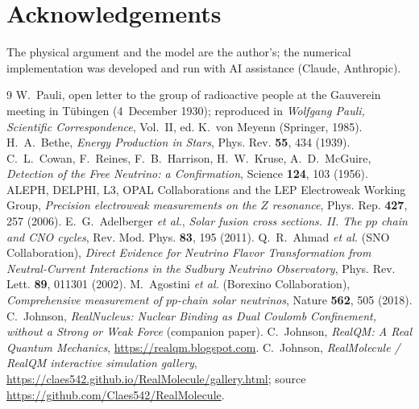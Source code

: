 \documentclass[11pt]{article}
\begin{document}
\section*{Acknowledgements}
The physical argument and the model are the author's; the numerical implementation was developed and
run with AI assistance (Claude, Anthropic).

\begin{thebibliography}{9}
 W.~Pauli, open letter to the group of radioactive people at the Gauverein meeting in
T\"ubingen (4~December 1930); reproduced in \emph{Wolfgang Pauli, Scientific Correspondence}, Vol.~II,
ed. K.~von Meyenn (Springer, 1985).
 H.~A.~Bethe, \emph{Energy Production in Stars}, Phys. Rev. \textbf{55}, 434 (1939).
 C.~L.~Cowan, F.~Reines, F.~B.~Harrison, H.~W.~Kruse, A.~D.~McGuire,
\emph{Detection of the Free Neutrino: a Confirmation}, Science \textbf{124}, 103 (1956).
 ALEPH, DELPHI, L3, OPAL Collaborations and the LEP Electroweak Working Group,
\emph{Precision electroweak measurements on the $Z$ resonance}, Phys. Rep. \textbf{427}, 257 (2006).
 E.~G.~Adelberger \emph{et al.}, \emph{Solar fusion cross sections. II. The
$pp$ chain and CNO cycles}, Rev. Mod. Phys. \textbf{83}, 195 (2011).
 Q.~R.~Ahmad \emph{et al.} (SNO Collaboration), \emph{Direct Evidence for Neutrino Flavor
Transformation from Neutral-Current Interactions in the Sudbury Neutrino Observatory}, Phys. Rev. Lett.
\textbf{89}, 011301 (2002).
 M.~Agostini \emph{et al.} (Borexino Collaboration), \emph{Comprehensive measurement
of $pp$-chain solar neutrinos}, Nature \textbf{562}, 505 (2018).
 C.~Johnson, \emph{RealNucleus: Nuclear Binding as Dual Coulomb
Confinement, without a Strong or Weak Force} (companion paper).
 C.~Johnson, \emph{RealQM: A Real Quantum Mechanics},
\url{https://realqm.blogspot.com}.
 C.~Johnson, \emph{RealMolecule / RealQM interactive simulation gallery},
\url{https://claes542.github.io/RealMolecule/gallery.html}; source
\url{https://github.com/Claes542/RealMolecule}.
\end{thebibliography}
\end{document}

